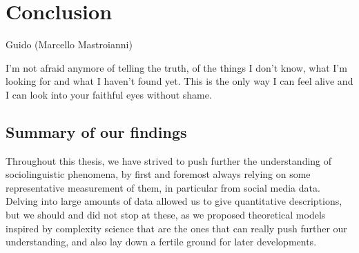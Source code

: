 \documentclass[../thesis.tex]{subfiles}
\begin{document}
\chapter{Conclusion}
\label{ch:conclusion}

\epigraph{
  \begin{center}
    \textnormal{Guido (Marcello Mastroianni)}\\
  \end{center}
  I'm not afraid anymore of telling the truth, of the things I don't know, what I'm
  looking for and what I haven't found yet. This is the only way I can feel alive and I
  can look into your faithful eyes without shame.
}{
}


\section{Summary of our findings}
Throughout this thesis, we have strived to push further the understanding of
sociolinguistic phenomena, by first and foremost always relying on some representative
measurement of them, in particular from social media data. Delving into large amounts of
data allowed us to give quantitative descriptions, but we should and did not stop at
these, as we proposed theoretical models inspired by complexity science that are the
ones that can really push further our understanding, and also lay down a fertile ground
for later developments.
\end{document}
